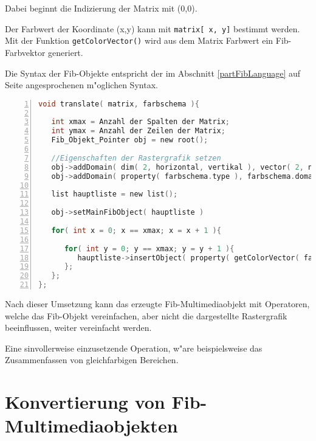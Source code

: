 \begin{flushleft}
Dabei beginnt die Indizierung der Matrix mit (0,0).

Der Farbwert der Koordinate (x,y) kann mit \verb|matrix[ x, y]| bestimmt werden. Mit der Funktion \verb|getColorVector()| wird aus dem Matrix Farbwert ein Fib-Farbvektor generiert.

Die Syntax der Fib-Objekte entspricht der im Abschnitt \ref{partFibLanguage} auf Seite \pageref{partFibLanguage} angesprochenen m"oglichen Syntax.
\end{flushleft}

\begin{lstlisting}[language=C, numbers=left, frame=single, caption={Algorithmus zur Erzeugung eines korrekten Fib-Objekts aus einer Bildmatrik}, label={allPicturesKonverter}, breaklines, basicstyle=\footnotesize\ttfamily, numberstyle=\tiny]
void translate( matrix, farbschema ){

   int xmax = Anzahl der Spalten der Matrix;
   int ymax = Anzahl der Zeilen der Matrix;
   Fib_Objekt_Pointer obj = new root();

   //Eigenschaften der Rastergrafik setzen
   obj->addDomain( dim( 2, horizontal, vertikal ), vector( 2, naturalNumber( xmax ), naturalNumber( ymax ) ) );
   obj->addDomain( property( farbschema.type ), farbschema.domain );

   list hauptliste = new list();

   obj->setMainFibObject( hauptliste )

   for( int x = 0; x == xmax; x = x + 1 ){

      for( int y = 0; y == xmax; y = y + 1 ){
         hauptliste->insertObject( property( getColorVector( farbschema.type, matrix[x,y] ) , p( (x,y) ) ) );
      };
   };
};
\end{lstlisting}

Nach dieser Umsetzung kann das erzeugte Fib-Multimediaobjekt mit Operatoren, welche das Fib-Objekt vereinfachen, aber nicht die dargestellte Rastergrafik beeinflussen, weiter vereinfacht werden.

Eine sinvollerweise einzusetzende Operation, w"are beispielsweise das Zusammenfassen von gleichfarbigen Bereichen.



\section{Konvertierung von Fib-Multimediaobjekten}

